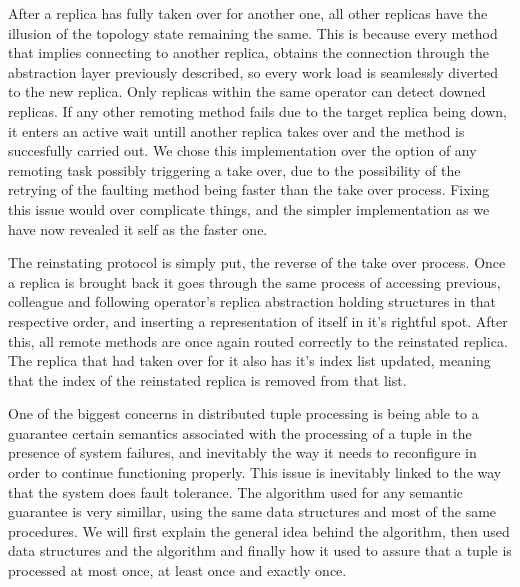 \documentclass[times, 10pt,twocolumn]{article}
\begin{document}
After a replica has fully taken over for another one, all other replicas
have the illusion of the topology state remaining the same. This is
because every method that implies connecting to another replica, obtains
the connection through the abstraction layer previously described, so
every work load is seamlessly diverted to the new replica.  Only replicas
within the same operator can detect downed replicas. If any other remoting
method fails due to the target replica being down, it enters an active
wait untill another replica takes over and the method is succesfully
carried out. We chose this implementation over the option of any remoting
task possibly triggering a take over, due to the possibility of the
retrying of the faulting method being faster than the take over process.
Fixing this issue would over complicate things, and the simpler
implementation as we have now revealed it self as the faster one.

The reinstating protocol is simply put, the reverse of the take over
process. Once a replica is brought back it goes through the same process
of accessing previous, colleague and following operator's replica
abstraction holding structures in that respective order, and inserting a
representation of itself in it's rightful spot.  After this, all remote
methods are once again routed correctly to the reinstated replica.  The
replica that had taken over for it also has it's index list updated,
meaning that the index of the reinstated replica is removed from that
list.

One of the biggest concerns in distributed tuple processing is being able
to a guarantee certain semantics associated with the processing of a tuple
in the presence of system failures, and inevitably the way it needs to
reconfigure in order to continue functioning properly. This issue is
inevitably linked to the way that the system does fault tolerance. The
algorithm used for any semantic guarantee is very simillar, using the same
data structures and most of the same procedures. We will first explain the
general idea behind the algorithm, then used data structures and the
algorithm and finally how it used to assure that a tuple is processed at
most once, at least once and exactly once.

\end{document}
